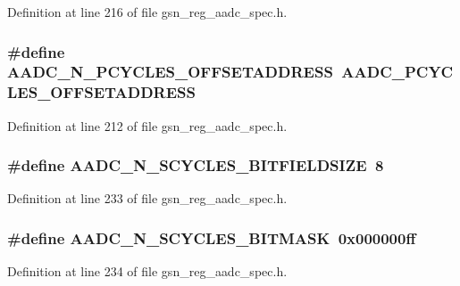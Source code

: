 Definition at line 216 of file gsn\_\-reg\_\-aadc\_\-spec.h.

\hypertarget{a00543_aedaa270127c40a0b3690ec0b1dd8808c}{
\subsubsection[{AADC\_\-N\_\-PCYCLES\_\-OFFSETADDRESS}]{\setlength{\rightskip}{0pt plus 5cm}\#define AADC\_\-N\_\-PCYCLES\_\-OFFSETADDRESS~AADC\_\-PCYCLES\_\-OFFSETADDRESS}}
\label{a00543_aedaa270127c40a0b3690ec0b1dd8808c}


Definition at line 212 of file gsn\_\-reg\_\-aadc\_\-spec.h.

\hypertarget{a00543_a212c6bd7a9be0bba048c165cca61844c}{
\subsubsection[{AADC\_\-N\_\-SCYCLES\_\-BITFIELDSIZE}]{\setlength{\rightskip}{0pt plus 5cm}\#define AADC\_\-N\_\-SCYCLES\_\-BITFIELDSIZE~8}}
\label{a00543_a212c6bd7a9be0bba048c165cca61844c}


Definition at line 233 of file gsn\_\-reg\_\-aadc\_\-spec.h.

\hypertarget{a00543_a729ce31547e8f9d98e7463ff87475076}{
\subsubsection[{AADC\_\-N\_\-SCYCLES\_\-BITMASK}]{\setlength{\rightskip}{0pt plus 5cm}\#define AADC\_\-N\_\-SCYCLES\_\-BITMASK~0x000000ff}}
\label{a00543_a729ce31547e8f9d98e7463ff87475076}


Definition at line 234 of file gsn\_\-reg\_\-aadc\_\-spec.h.

